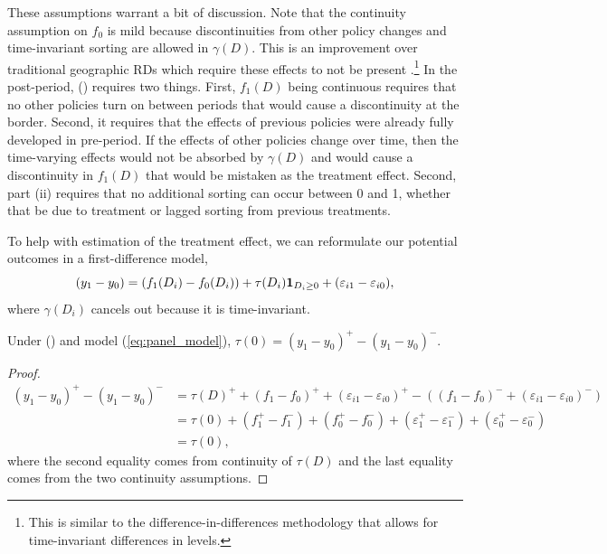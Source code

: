 \documentclass[12pt]{article}
\begin{document}
These assumptions warrant a bit of discussion. Note that the continuity assumption on $f_0$ is mild because discontinuities from other policy changes and time-invariant sorting are allowed in $\gamma(D)$. This is an improvement over traditional geographic RDs which require these effects to not be present \citep{Keele_Titiunik_2015}.\footnote{This is similar to the difference-in-differences methodology that allows for time-invariant differences in levels.} In the post-period, () requires two things. First, $f_1(D)$ being continuous requires that no other policies turn on between periods that would cause a discontinuity at the border. Second, it requires that the effects of previous policies were already fully developed in pre-period. If the effects of other policies change over time, then the time-varying effects would not be absorbed by $\gamma(D)$ and would cause a discontinuity in $f_1(D)$ that would be mistaken as the treatment effect. Second, part (ii) requires that no additional sorting can occur between 0 and 1, whether that be due to treatment or lagged sorting from previous treatments.

To help with estimation of the treatment effect, we can reformulate our potential outcomes in a first-difference model, $$
    (y_1 - y_0) = (f_1(D_i) - f_0(D_i)) + \tau(D_i)\mathbf{1}_{D_i \geq 0} + (\varepsilon_{i1} - \varepsilon_{i0}),
$$
where $\gamma(D_i)$ cancels out because it is time-invariant. 

\begin{theorem}
    Under () and model (\ref{eq:panel_model}), $\tau(0) = (y_1 - y_0)^+ - (y_1 - y_0)^-$.
\end{theorem}

\begin{proof}
    \begin{align*}
        (y_1 - y_0)^+ - (y_1 - y_0)^- &= \tau(D)^{+} + (f_1 - f_0)^+  + (\varepsilon_{i1} - \varepsilon_{i0})^+ - ((f_1 - f_0)^-  + (\varepsilon_{i1} - \varepsilon_{i0})^-) \\
        &= \tau(0) + (f_1^+ - f_1^-) + (f_0^+ - f_0^-) + (\varepsilon_1^+ - \varepsilon_1^-) + (\varepsilon_0^+ - \varepsilon_0^-) \\
        &= \tau(0),
    \end{align*}
    where the second equality comes from continuity of $\tau(D)$ and the last equality comes from the two continuity assumptions.
\end{proof}
\end{document}
